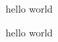 \documentclass[a4paper,12pt]{article}
\begin{document}
\begin{ColorThemedBox}[3][hello][2]
	hello world
\end{ColorThemedBox}
	hello world
\end{document}
